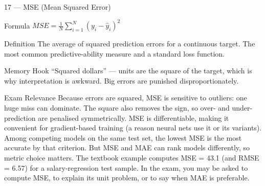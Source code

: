 \documentclass[aspectratio=169,8pt]{beamer}
\begin{document}
	\begin{frame}{17 --- MSE (Mean Squared Error)}
		\begin{block}{Formula}
			$MSE = \frac{1}{N}\sum_{i=1}^{N}(y_i - \hat{y}_i)^2$
		\end{block}
		\begin{block}{Definition}
			The average of squared prediction errors for a continuous target. The most common predictive-ability measure and a standard loss function.
		\end{block}
		\begin{block}{Memory Hook}
			``Squared dollars'' --- units are the square of the target, which is why interpretation is awkward. Big errors are punished disproportionately.
		\end{block}
		\begin{block}{Exam Relevance}
			Because errors are squared, MSE is sensitive to outliers: one huge miss can dominate. The square also removes the sign, so over- and under-prediction are penalised symmetrically. MSE is differentiable, making it convenient for gradient-based training (a reason neural nets use it or its variants). Among competing models on the same test set, the lowest MSE is the most accurate by that criterion. But MSE and MAE can rank models differently, so metric choice matters. The textbook example computes MSE = 43.1 (and RMSE = 6.57) for a salary-regression test sample. In the exam, you may be asked to compute MSE, to explain its unit problem, or to say when MAE is preferable.
		\end{block}
	\end{frame}
	
\end{document}
